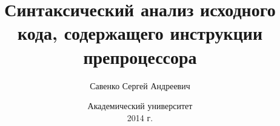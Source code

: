 \documentclass{beamer}
\title{Синтаксический анализ исходного кода, содержащего инструкции препроцессора}
\author{Савенко Сергей Андреевич}
\institute{{\tiny научный руководитель} \\ \vspace{.10cm} Игнатов Сергей Сергеевич}
\date{\scriptsize Академический университет\\ \vspace{.10cm} 2014 г.}
\begin{document}
\frame{\titlepage}
\end{document}
